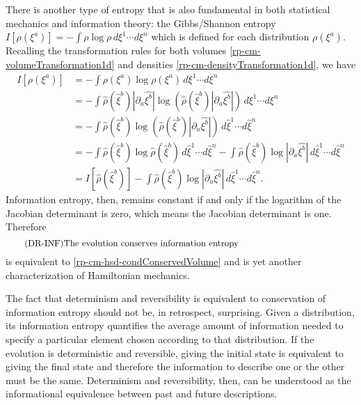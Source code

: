 There is another type of entropy that is also fundamental in both statistical mechanics and information theory: the Gibbs/Shannon entropy $I[\rho(\xi^a)]=-\int \rho \log \rho \, d\xi^1 \cdots d\xi^n$ which is defined for each distribution $\rho(\xi^a)$. Recalling the transformation rules for both volumes \ref{rp-cm-volumeTransformation1d} and densities \ref{rp-cm-densityTransformation1d}, we have
\begin{equation}
	\begin{aligned}
	I[\rho(\xi^a)] &= - \int \rho(\xi^a) \log \rho(\xi^a) \, d\xi^1 \cdots d\xi^n \\
&= - \int  \hat{\rho}(\hat{\xi}^b) \left| \partial_a \hat{\xi^b} \right| \log \left( \hat{\rho}(\hat{\xi}^b) \left| \partial_a \hat{\xi^b} \right| \right) \, d\xi^1 \cdots d\xi^n \\
&= - \int \hat{\rho}(\hat{\xi}^b) \log \left( \hat{\rho}(\hat{\xi}^b) \left| \partial_a \hat{\xi^b} \right| \right) \, d\hat{\xi}^1 \cdots d\hat{\xi}^n \\
&= - \int \hat{\rho}(\hat{\xi}^b) \log \hat{\rho}(\hat{\xi}^b) \, d\hat{\xi}^1 \cdots d\hat{\xi}^n - \int \hat{\rho}(\hat{\xi}^b) \log \left| \partial_a \hat{\xi^b} \right| \, d\hat{\xi}^1 \cdots d\hat{\xi}^n \\
&= I[\hat{\rho}(\hat{\xi}^b)] - \int \hat{\rho}(\hat{\xi}^b) \log \left| \partial_a \hat{\xi^b} \right| \, d\hat{\xi}^1 \cdots d\hat{\xi}^n.
	\end{aligned}
\end{equation}
Information entropy, then, remains constant if and only if the logarithm of the Jacobian determinant is zero, which means the Jacobian determinant is one. Therefore
\begin{equation}\label{rp-cm-hsd-condInformation}
	\tag{DR-INF}
	\eqtext{The evolution conserves information entropy}	
\end{equation}
is equivalent to \ref{rp-cm-hsd-condConservedVolume} and is yet another characterization of Hamiltonian mechanics.

The fact that determinism and reversibility is equivalent to conservation of information entropy should not be, in retrospect, surprising. Given a distribution, its information entropy quantifies the average amount of information needed to specify a particular element chosen according to that distribution. If the evolution is deterministic and reversible, giving the initial state is equivalent to giving the final state and therefore the information to describe one or the other must be the same. Determinism and reversibility, then, can be understood as the informational equivalence between past and future descriptions.


